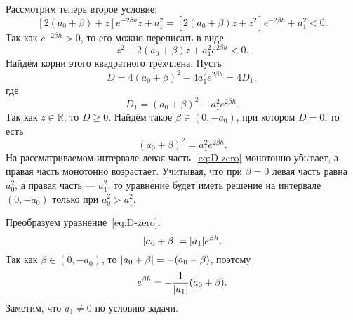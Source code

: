 \documentclass[a4paper,14pt]{article}
\begin{document}
Рассмотрим теперь второе условие:
\begin{equation*}
  \left[
    2 (a_0 + \beta) + z
  \right] e^{-2 \beta h} z + a_1^2
  =
  \left[
    2 (a_0 + \beta) z + z^2
  \right] e^{-2 \beta h} + a_1^2 < 0.
\end{equation*}
Так как $e^{-2 \beta h} > 0$, то его можно переписать в виде
\begin{equation*}
  z^2 + 2 (a_0 + \beta) z + a_1^2 e^{2 \beta h} < 0.
\end{equation*}
Найдём корни этого квадратного трёхчлена. Пусть
\begin{equation*}
  D = 4 {(a_0 + \beta)}^2 - 4 a_1^2 e^{2 \beta h} = 4 D_1,
\end{equation*}
где
\begin{equation*}
  D_1 = {(a_0 + \beta)}^2 - a_1^2 e^{2 \beta h}.
\end{equation*}
Так как $z \in \mathbb{R}$, то $D \geqslant 0$. Найдём такое $\beta \in (0, -a_0)$,
при котором $D = 0$, то есть
\begin{equation}
  \label{eq:D-zero}
  {(a_0 + \beta)}^2 = a_1^2 e^{2 \beta h}.
\end{equation}
На рассматриваемом интервале левая часть~\eqref{eq:D-zero} монотонно убывает, а
правая часть монотонно возрастает. Учитывая, что при $\beta = 0$ левая часть
равна $a_0^2$, а правая часть --- $a_1^2$, то уравнение будет иметь решение на
интервале $(0, -a_0)$ только при $a_0^2 > a_1^2$.

Преобразуем уравнение~\eqref{eq:D-zero}:
\begin{equation*}
  \abs{a_0 + \beta} = \abs{a_1} e^{\beta h}.
\end{equation*}
Так как $\beta \in (0, -a_0)$, то $\abs{a_0 + \beta} = - (a_0 + \beta)$,
поэтому
\begin{equation*}
  e^{\beta h} = - \frac{1}{\abs{a_1}} (a_0 + \beta).
\end{equation*}
Заметим, что $a_1 \neq 0$ по условию задачи.
\end{document}
